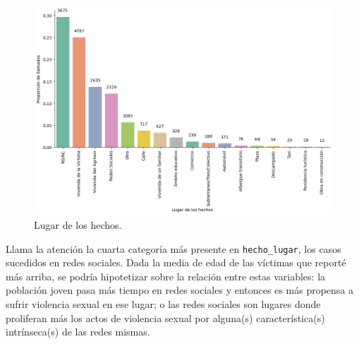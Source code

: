 \documentclass[10 pt]{article}
\begin{document}
\begin{figure}[H]
    \begin{center}
    \includegraphics[scale=.4]{images/latex_lugar_hechos.png}
    \caption{Lugar de los hechos.}
    \label{hecholugar}
    \end{center}
    \end{figure}


Llama la atención la cuarta categoría más presente en \texttt{hecho\_lugar}, los casos sucedidos en redes sociales. Dada la media de edad de las víctimas que reporté más arriba, se podría hipotetizar sobre la relación entre estas variables: la población joven pasa más tiempo en redes sociales y entonces es más propensa a sufrir violencia sexual en ese lugar; o las redes sociales son lugares donde proliferan más los actos de violencia sexual por alguna(s) característica(s) intrínseca(s) de las redes mismas. 

\end{document}
